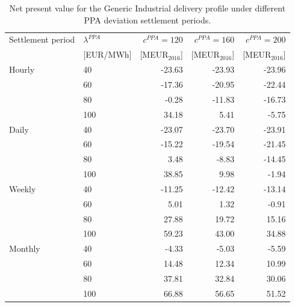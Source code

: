 \begin{table}[H]
\centering
\small
\caption{Net present value for the Generic Industrial delivery profile under different PPA deviation settlement periods.}
\label{tab:npv_generic_industrial}
\begin{tabular}{llrrr}
\toprule
Settlement period & $\lambda^{PPA}$ & $c^{PPA}=120$ & $c^{PPA}=160$ & $c^{PPA}=200$ \\
 & [EUR/MWh] & [MEUR$_{2016}$] & [MEUR$_{2016}$] & [MEUR$_{2016}$] \\
\midrule
Hourly & 40 & -23.63 & -23.93 & -23.96 \\
 & 60 & -17.36 & -20.95 & -22.44 \\
 & 80 & -0.28 & -11.83 & -16.73 \\
 & 100 & 34.18 & 5.41 & -5.75 \\
\addlinespace
Daily & 40 & -23.07 & -23.70 & -23.91 \\
 & 60 & -15.22 & -19.54 & -21.45 \\
 & 80 & 3.48 & -8.83 & -14.45 \\
 & 100 & 38.85 & 9.98 & -1.94 \\
\addlinespace
Weekly & 40 & -11.25 & -12.42 & -13.14 \\
 & 60 & 5.01 & 1.32 & -0.91 \\
 & 80 & 27.88 & 19.72 & 15.16 \\
 & 100 & 59.23 & 43.00 & 34.88 \\
\addlinespace
Monthly & 40 & -4.33 & -5.03 & -5.59 \\
 & 60 & 14.48 & 12.34 & 10.99 \\
 & 80 & 37.81 & 32.84 & 30.06 \\
 & 100 & 66.88 & 56.65 & 51.52 \\
\bottomrule
\end{tabular}
\end{table}

